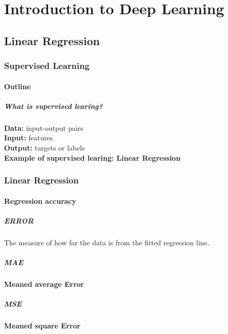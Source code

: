 \part{Introduction to Deep Learning}
\chapter{Linear Regression}
\section{Supervised Learning}
\subsection{Outline}
\subsubsection{What is supervised learing?}
\textbf{Data:} input-output pairs\\

\textbf{Input:} features\\
\textbf{Output:} targets or labels\\
\textbf{Example of supervised learing: Linear Regression}\\


\section{Linear Regression}

\subsection{Regression accuracy}
\subsubsection{ERROR}
The measure of how far the data is from the fitted regression line.\\

\subsubsection{MAE}
\textbf{Meaned average Error}

\subsubsection{MSE}
\textbf{Meaned square Error}


